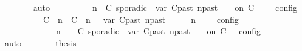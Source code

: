 \begin{isabellebody}
\ \ \ \ \ \ \isamarkupfalse%
\ auto\isanewline
\ \ \ \ \isamarkupfalse%
\ \isamarkupfalse%
\ {\isacartoucheopen}{\isasymlbrakk}\ {\isasymGamma}{\isacharcomma}\ n\ {\isasymturnstile}\ {\isacharparenleft}{\isacharparenleft}C\ sporadic{\isasymsharp}\ {\isasymlparr}\ {\isasymtau}\isactrlsub v\isactrlsub a\isactrlsub r\ {\isacharparenleft}C\isactrlsub p\isactrlsub a\isactrlsub s\isactrlsub t{\isacharcomma}\ n\isactrlsub p\isactrlsub a\isactrlsub s\isactrlsub t{\isacharparenright}\ {\isasymoplus}\ {\isasymdelta}{\isasymtau}\ {\isasymrparr}\ on\ C\ {\isacharhash}\ {\isasymPsi}{\isacharparenright}\ {\isasymtriangleright}\ {\isasymPhi}\ {\isasymrbrakk}\isactrlsub c\isactrlsub o\isactrlsub n\isactrlsub f\isactrlsub i\isactrlsub g\isanewline
\ \ \ \ \ \ \ \ {\isacharequal}\ {\isasymlbrakk}\ {\isacharparenleft}{\isacharparenleft}C\ {\isasymUp}\ n{\isacharparenright}\ {\isacharhash}\ {\isacharparenleft}C\ {\isasymDown}\ n\ {\isacharat}{\isasymsharp}\ {\isasymlparr}\ {\isasymtau}\isactrlsub v\isactrlsub a\isactrlsub r\ {\isacharparenleft}C\isactrlsub p\isactrlsub a\isactrlsub s\isactrlsub t{\isacharcomma}\ n\isactrlsub p\isactrlsub a\isactrlsub s\isactrlsub t{\isacharparenright}\ {\isasymoplus}\ {\isasymdelta}{\isasymtau}\ {\isasymrparr}{\isacharparenright}\ {\isacharhash}\ {\isasymGamma}{\isacharparenright}{\isacharcomma}\ n\ {\isasymturnstile}\ {\isasymPsi}\ {\isasymtriangleright}\ {\isasymPhi}\ {\isasymrbrakk}\isactrlsub c\isactrlsub o\isactrlsub n\isactrlsub f\isactrlsub i\isactrlsub g\isanewline
\ \ \ \ \ \ \ \ \ \ {\isasymunion}\ {\isasymlbrakk}\ {\isasymGamma}{\isacharcomma}\ n\ {\isasymturnstile}\ {\isasymPsi}\ {\isasymtriangleright}\ {\isacharparenleft}{\isacharparenleft}C\ sporadic{\isasymsharp}\ {\isasymlparr}\ {\isasymtau}\isactrlsub v\isactrlsub a\isactrlsub r\ {\isacharparenleft}C\isactrlsub p\isactrlsub a\isactrlsub s\isactrlsub t{\isacharcomma}\ n\isactrlsub p\isactrlsub a\isactrlsub s\isactrlsub t{\isacharparenright}\ {\isasymoplus}\ {\isasymdelta}{\isasymtau}\ {\isasymrparr}\ on\ C\ {\isacharhash}\ {\isasymPhi}{\isacharparenright}\ {\isasymrbrakk}\isactrlsub c\isactrlsub o\isactrlsub n\isactrlsub f\isactrlsub i\isactrlsub g{\isacartoucheclose}\isanewline
\ \ \ \ \ \ \isamarkupfalse%
\ auto\isanewline
\ \ \ \ \isamarkupfalse%
\ \isamarkupfalse%
\ {\isacharquery}thesis\ \isamarkupfalse%

\end{isabellebody}
